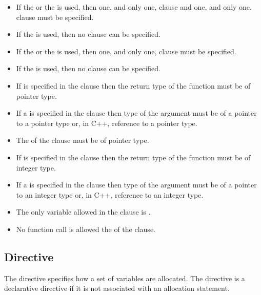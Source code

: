 \begin{ccppspecific}
\restrictions
\begin{itemize}
\item If the   or the   is used, then one, and only one,  clause and one, and only one,  clause must be specified.
\item If the   is used, then no  clause can be specified.
\item If the   or the   is used, then one, and only one,  clause must be specified.
\item If the   is used, then no  clause can be specified.
\item If  is specified in the  clause then the return type of the function must be of pointer type.
\item If a  is specified in the  clause then type of the argument must be of a pointer to a pointer type or, in C++, reference to a pointer type.
\item The  of the  clause must be of pointer type.
\item If  is specified in the  clause then the return type of the function must be of integer type.
\item If a  is specified in the  clause then type of the argument must be of a pointer to an integer type or, in C++, reference to an integer type.
\item The only variable allowed in the  clause is .
\item No function call is allowed the  of the  clause.
\end{itemize}

\end{ccppspecific}



\subsection{ Directive}
\label{subsec:allocate Directive}
\summary

The  directive specifies how a set of variables are allocated. The  directive is a declarative directive if it is not associated with an allocation statement.

